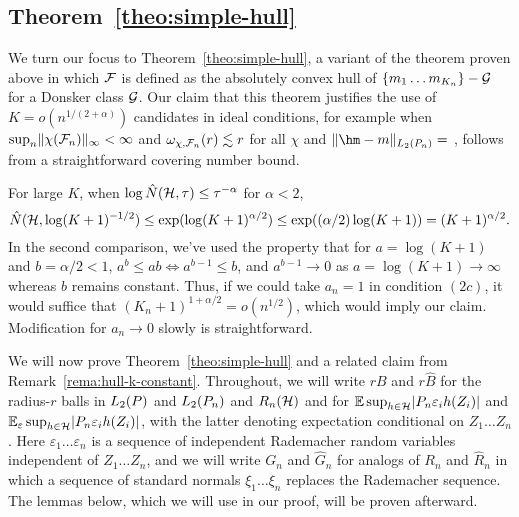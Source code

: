\subsection{Theorem~\ref{theo:simple-hull}}
\label{sec:appendix-flexible}
We turn our focus to Theorem~\ref{theo:simple-hull}, a variant of the theorem proven above
in which $\mathcal{F}$ is defined as the absolutely convex hull of $\{m_1 \ldots m_{K_n}\} - \mathcal{G}$ 
for a Donsker class $\mathcal{G}$. Our claim that this theorem justifies the use of $K=o(n^{1/(2+\alpha)})$ candidates
in ideal conditions, for example when $\sup_{n} \lVert\chi(\mathcal{F}_n)\rVert_{\infty} < \infty$ and $\omega_{\chi,\mathcal{F}_n}(r) \lesssim r$ for all $\chi$
and $\norm{\hm - m}_{L_2(\Pn)} =$ , follows from a straightforward covering number bound.

For large $K$, when $\log \hat N(\mathcal{H},\tau) \le \tau^{-\alpha}$ for $\alpha < 2$,
\[ \hat N(\mathcal{H},\log(K+1)^{-1/2}) \le \exp(\log(K+1)^{\alpha/2}) \le \exp((\alpha/2)\log(K+1)) = (K+1)^{\alpha/2}. \]
In the second comparison, we've used the property that for $a=\log(K+1)$ and $b=\alpha/2 < 1$,
$a^b \le ab \iff a^{b-1} \le b$, and $a^{b-1} \to 0$ as $a=\log(K+1) \to \infty$ whereas $b$ remains constant.
Thus, if we could take $a_n=1$ in condition $(2c)$, it would suffice that $(K_n+1)^{1+\alpha/2} = o(n^{1/2})$,
which would imply our claim. Modification for $a_n \to 0$ slowly is straightforward. 


We will now prove Theorem~\ref{theo:simple-hull} and a related claim from Remark~\ref{rema:hull-k-constant}.
Throughout, we will write $rB$ and $r\hat B$ for the radius-$r$ balls in $L_2(\P)$ and $L_2(\Pn)$
and $R_n(\mathcal{H})$ and  for $\E \sup_{h \in \HH}\abs{\Pn \varepsilon_i h(Z_i) }$ 
and $\E_{\varepsilon} \sup_{h \in \HH}\abs{\Pn \varepsilon_i h(Z_i)}$, with the latter
denoting expectation conditional on $Z_1 \ldots Z_n$. 
Here $\varepsilon_1 \ldots \varepsilon_n$ is a sequence of independent Rademacher random variables independent of $Z_1 \ldots Z_n$,
and we will write $G_n$ and $\hat G_n$ for analogs of $R_n$ and $\hat R_n$ in which 
a sequence of standard normals $\xi_1 \ldots \xi_n$ replaces the Rademacher sequence.
The lemmas below, which we will use in our proof, will be proven afterward.

